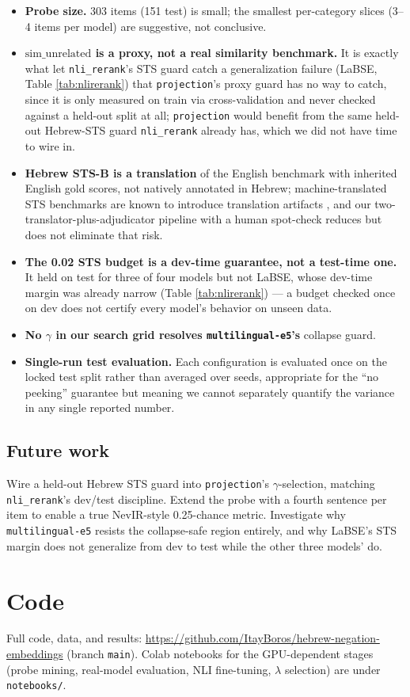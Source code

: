\documentclass{article}
\begin{document}
\begin{itemize}
\item \textbf{Probe size.} 303 items (151 test) is small; the smallest
per-category slices (3--4 items per model) are suggestive, not conclusive.
\item \textbf{$\mathrm{sim\_unrelated}$ is a proxy, not a real similarity
benchmark.} It is exactly what let \texttt{nli\_rerank}'s STS guard catch a
generalization failure (LaBSE, Table \ref{tab:nlirerank}) that
\texttt{projection}'s proxy guard has no way to catch, since it is only
measured on train via cross-validation and never checked against a held-out
split at all; \texttt{projection} would benefit from the same held-out
Hebrew-STS guard \texttt{nli\_rerank} already has, which we did not have
time to wire in.
\item \textbf{Hebrew STS-B is a translation} of the English benchmark
\citep{agirre2017semeval} with inherited English gold scores, not natively
annotated in Hebrew; machine-translated STS benchmarks are known to
introduce translation artifacts \citep{isbister2020swedish}, and our
two-translator-plus-adjudicator pipeline with a human spot-check reduces
but does not eliminate that risk.
\item \textbf{The 0.02 STS budget is a dev-time guarantee, not a test-time
one.} It held on test for three of four models but not LaBSE, whose
dev-time margin was already narrow (Table \ref{tab:nlirerank}) --- a
budget checked once on dev does not certify every model's behavior on
unseen data.
\item \textbf{No $\gamma$ in our search grid resolves \texttt{multilingual-e5}'s}
collapse guard.
\item \textbf{Single-run test evaluation.} Each configuration is evaluated
once on the locked test split rather than averaged over seeds, appropriate
for the ``no peeking'' guarantee but meaning we cannot separately quantify
the variance in any single reported number.
\end{itemize}

\subsection{Future work}

Wire a held-out Hebrew STS guard into \texttt{projection}'s
$\gamma$-selection, matching \texttt{nli\_rerank}'s dev/test discipline.
Extend the probe with a fourth sentence per item to enable a true
NevIR-style 0.25-chance metric. Investigate why \texttt{multilingual-e5}
resists the collapse-safe region entirely, and why LaBSE's STS margin does
not generalize from dev to test while the other three models' do.

\section{Code}

Full code, data, and results:
\url{https://github.com/ItayBoros/hebrew-negation-embeddings} (branch
\texttt{main}). Colab notebooks for the GPU-dependent stages (probe mining,
real-model evaluation, NLI fine-tuning, $\lambda$ selection) are under
\texttt{notebooks/}.



\end{document}
